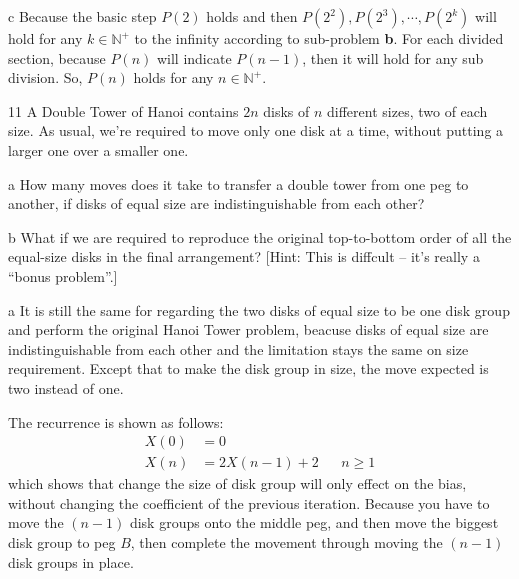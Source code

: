 \documentclass[a4paper,12pt]{article}
\makeatletter
\newtheorem*{solution}{Solution}
\theoremstyle{definition}
\renewenvironment{solution}[1][Solution] {\par\pushQED{\qed}\normalfont\topsep6\p@\@plus6\p@\relax\trivlist\item[\hskip\labelsep\bfseries#1\@addpunct{.}]\ignorespaces}{\popQED\endtrivlist\@endpefalse} \makeatother
\newenvironment{problems}{\begin{list}{}{\renewcommand{\makelabel}[1]{\textbf{##1}\hfil}}}{\end{list}}
\newenvironment{steps}{\begin{list}{}{\renewcommand{\makelabel}[1]{\textbf{##1}\hfil}}}{\end{list}}
\makeatother
\begin{document}
\begin{problems}
\begin{solution}
\begin{steps}
            \item[c] Because the basic step $P(2)$ holds and then $P(2^2), P(2^3), \cdots, P(2^k)$ will hold for any $k\in \mathbb{N}^+$ to the infinity according to sub-problem \textbf{b}. For each divided section, because $P(n)$ will indicate $P(n-1)$, then it will hold for any sub division. So, $P(n)$ holds for any $n\in \mathbb{N}^+$.
        \end{steps}
    \end{solution}
    \item[11] A Double Tower of Hanoi contains $2n$ disks of $n$ different sizes, two of
    each size. As usual, we're required to move only one disk at a time,
    without putting a larger one over a smaller one.
        \begin{steps}
            \item[a] How many moves does it take to transfer a double tower from one
            peg to another, if disks of equal size are indistinguishable from each
            other?
            \item[b] What if we are required to reproduce the original top-to-bottom
            order of all the equal-size disks in the final arrangement? [Hint:
            This is diffcult -- it's really a ``bonus problem''.]
        \end{steps}
    \begin{solution}
        \begin{steps}
            \item[a] It is still the same for regarding the two disks of equal size to be one disk group and perform the original Hanoi Tower problem, beacuse disks of equal size are indistinguishable from each other and the limitation stays the same on size requirement. Except that to make the disk group in size, the move expected is two instead of one.
            
            The recurrence is shown as follows:
            \begin{align*}
                X(0) &= 0 \\
                X(n) &= 2X(n-1) + 2 && n\geq 1
            \end{align*} 
            which shows that change the size of disk group will only effect on the bias, without changing the coefficient of the previous iteration. Because you have to move the $(n-1)$ disk groups onto the middle peg, and then move the biggest disk group to peg $B$, then complete the movement through moving the $(n-1)$ disk groups in place.


\end{steps}
\end{solution}
\end{problems}
\end{document}
